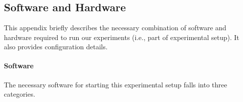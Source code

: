\documentclass[bdcc,article,submit,pdftex,moreauthors]{Definitions/mdpi}
\begin{document}

\appendixstart
\appendix
\section[\appendixname~\thesection]{}
\subsection[\appendixname~\thesubsection]{Software and Hardware}
\label{app:sub_sw_hw}
This appendix briefly describes the necessary combination of software and hardware required to run our experiments  (i.e., part of experimental setup). It also provides configuration details.

\paragraph{Software} The necessary software for starting this experimental setup falls into three categories.
\end{document}
